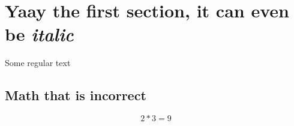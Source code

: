 \documentclass{article}\usepackage[T1]{fontenc}
\begin{document}
\section{Yaay the first section, it can even be \textit{italic}}
Some regular text
\subsection{Math that is incorrect}
$$2*3 = 9$$
\end{document}
